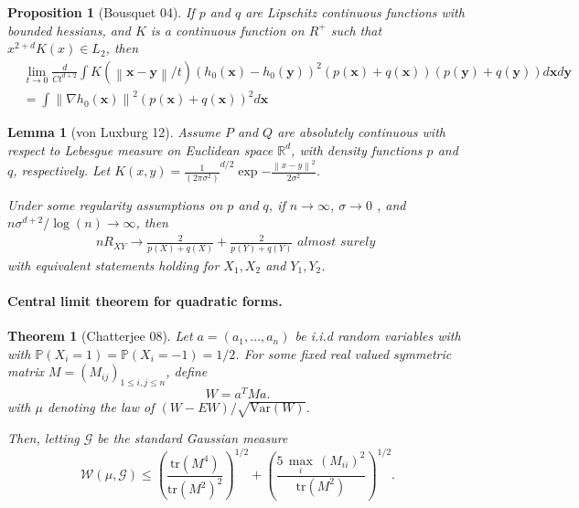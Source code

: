 \documentclass{article}
\newcommand{\Reals}{\mathbb{R}}
\newcommand{\Var}[1]{\mathrm{Var}\left( #1 \right)}
\newcommand{\Prob}[1]{\mathbb{P}\left( #1 \right)}
\newcommand{\norm}[1]{\left\lVert#1\right\rVert}
\newcommand{\tr}{\text{tr}}
\newcommand{\x}{\textbf{x}}
\newcommand{\y}{\textbf{y}}
\theoremstyle{alden}
\newtheorem{theorem}{Theorem}
\newtheorem{lemma}{Lemma}
\newtheorem{proposition}{Proposition}
\theoremstyle{definition}
\theoremstyle{remark}
\begin{document}
\begin{proposition}[Bousquet 04]
	\label{prop: bousquet04}
	If $p$ and $q$ are Lipschitz continuous functions with bounded hessians, and $K$ is a continuous function on $R^+$ such that $x^{2 + d} K(x) \in L_2$, then 
	\begin{align}
	\label{eqn: bousquet04}
	& \underset{t \to 0}{\lim} \frac{d}{Ct^{d+2}} \int  K(\norm{\x - \y}/ t)(h_0(\x) - h_0(\y))^2 (p(\x) + q(\x))(p(\y) + q(\y)) d\x d \y \nonumber \\
	& = \int \norm{\nabla h_0(\x)}^2 (p(\x) + q(\x))^2 d\x
	\end{align}
\end{proposition}

\begin{lemma}[von Luxburg 12]
	\label{lem: vonluxburg12}
	Assume $P$ and $Q$ are absolutely continuous with respect to Lebesgue measure on Euclidean space $\Reals^d$, with density functions $p$ and $q$, respectively. Let $K(x,y) = \frac{1}{(2\pi \sigma^2)}^{d/2} \exp{-\frac{\norm{x - y}^2}{2 \sigma^2}}$. 
	
	Under some regularity assumptions on $p$ and $q$, if $n \to \infty$, $\sigma \to 0$ , and $n\sigma^{d+2}/ \log(n) \to \infty$, then
	\begin{align*}
	n R_{XY} \to \frac{2}{p(X) + q(X)} + \frac{2}{p(Y) + q(Y)} \textit{ almost surely }
	\end{align*}
	with equivalent statements holding for $X_1, X_2$ and $Y_1, Y_2$.  
\end{lemma}

\paragraph{Central limit theorem for quadratic forms.}

\begin{theorem}[Chatterjee 08]
	\label{thm: clt_quadratic_forms}
	Let $a = (a_1, \ldots, a_n)$ be i.i.d random variables with with $\Prob{X_i = 1} = \Prob{X_i = -1} = 1/2$. For some fixed real valued symmetric matrix $M = (M_{ij})_{1 \leq i, j \leq n}$, define
	\begin{equation*}
	W = a^T M a.
	\end{equation*}
	with $\mu$ denoting the law of $(W - EW) / \sqrt{\Var{W}}$.
	
	Then, letting $\mathcal{G}$ be the standard Gaussian measure 
	\begin{equation}
	\label{eqn: wass_distance_to_normal}
	\mathcal{W}(\mu, \mathcal{G} ) \leq \left(\frac{\tr(M^4)}{\tr(M^2)^2} \right)^{1/2} + \left( \frac{5 \, \underset{i}{\max} \, (M_{ii})^2}{\tr(M^2)} \right)^{1/2}.
	\end{equation}
\end{theorem}
\end{document}
